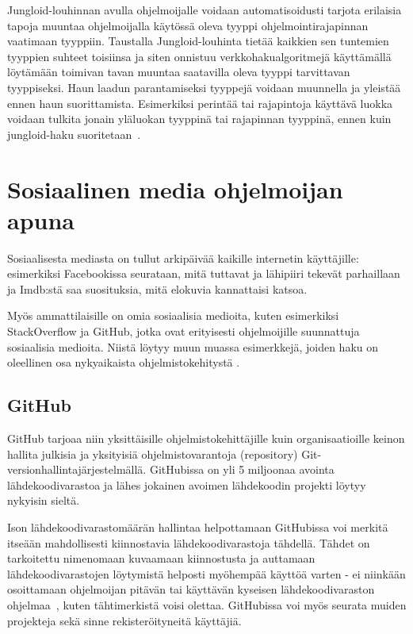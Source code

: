 \documentclass[finnish]{tktltiki2}
\theoremstyle{definition}
\theoremstyle{remark}
\begin{document}
Jungloid-louhinnan avulla ohjelmoijalle voidaan automatisoidusti tarjota erilaisia tapoja muuntaa ohjelmoijalla käytössä oleva tyyppi ohjelmointirajapinnan vaatimaan tyyppiin. Taustalla Jungloid-louhinta tietää kaikkien sen tuntemien tyyppien suhteet toisiinsa ja siten onnistuu verkkohakualgoritmejä käyttämällä löytämään toimivan tavan muuntaa saatavilla oleva tyyppi tarvittavan tyyppiseksi. Haun laadun parantamiseksi tyyppejä voidaan muunnella ja yleistää ennen haun suorittamista. Esimerkiksi perintää tai rajapintoja käyttävä luokka voidaan tulkita jonain yläluokan tyyppinä tai rajapinnan tyyppinä, ennen kuin jungloid-haku suoritetaan~\cite{jungloid-mining}.

\section{Sosiaalinen media ohjelmoijan apuna}
\label{section:kolmastk}
Sosiaalisesta mediasta on tullut arkipäivää kaikille internetin käyttäjille: esimerkiksi Facebookissa seurataan, mitä tuttavat ja lähipiiri tekevät parhaillaan ja Imdb:stä saa  suosituksia, mitä elokuvia kannattaisi katsoa.

Myös ammattilaisille on omia sosiaalisia medioita, kuten esimerkiksi StackOverflow ja GitHub, jotka ovat erityisesti ohjelmoijille suunnattuja sosiaalisia medioita. Niistä löytyy muun muassa esimerkkejä, joiden haku on oleellinen osa nykyaikaista ohjelmistokehitystä \cite{example-overflow-social-media-for-code-recommendations}.

\subsection{GitHub}
GitHub tarjoaa niin yksittäisille ohjelmistokehittäjille kuin organisaatioille keinon hallita julkisia ja yksityisiä ohjelmistovarantoja (repository) Git-versionhallintajärjestelmällä. GitHubissa on yli 5 miljoonaa avointa lähdekoodivarastoa ja lähes jokainen avoimen lähdekoodin projekti löytyy nykyisin sieltä.

Ison lähdekoodivarastomäärän hallintaa helpottamaan GitHubissa voi merkitä itseään mahdollisesti kiinnostavia lähdekoodivarastoja tähdellä. Tähdet on tarkoitettu nimenomaan kuvaamaan kiinnostusta ja auttamaan lähdekoodivarastojen löytymistä helposti myöhempää käyttöä varten - ei niinkään osoittamaan ohjelmoijan pitävän tai käyttävän kyseisen lähdekoodivaraston ohjelmaa~\cite{social-networking-meets-se}, kuten tähtimerkistä voisi olettaa. GitHubissa voi myös seurata muiden projekteja sekä sinne rekisteröityneitä käyttäjiä.
\end{document}
